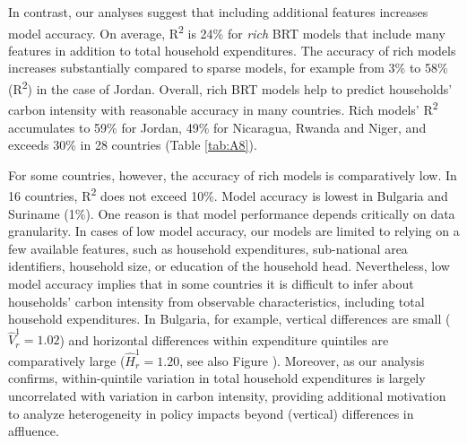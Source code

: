 \documentclass[12pt, a4paper]{article}
\begin{document}
In contrast, our analyses suggest that including additional features increases model accuracy. On average, R\textsuperscript{2} is 24\% for \textit{rich} BRT models that include many features in addition to total household expenditures. The accuracy of rich models increases substantially compared to sparse models, for example from 3\% to 58\% (R\textsuperscript{2}) in the case of Jordan. Overall, rich BRT models help to predict households' carbon intensity with reasonable accuracy in many countries. Rich models' R\textsuperscript{2} accumulates to 59\% for Jordan, 49\% for Nicaragua, Rwanda and Niger, and exceeds 30\% in 28 countries (Table \ref{tab:A8}).

For some countries, however, the accuracy of rich models is comparatively low. In 16 countries, R\textsuperscript{2} does not exceed 10\%. Model accuracy is lowest in Bulgaria and Suriname (1\%). One reason is that model performance depends critically on data granularity. In cases of low model accuracy, our models are limited to relying on a few available features, such as household expenditures, sub-national area identifiers, household size, or education of the household head. Nevertheless, low model accuracy implies that in some countries it is difficult to infer about households' carbon intensity from observable characteristics, including total household expenditures. In Bulgaria, for example, vertical differences are small ($\widehat{V}_{r}^{1}=1.02$) and horizontal differences within expenditure quintiles are comparatively large ($\widehat{H}_{r}^{1}=1.20$, see also Figure ). Moreover, as our analysis confirms, within-quintile variation in total household expenditures is largely uncorrelated with variation in carbon intensity, providing additional motivation to analyze heterogeneity in policy impacts beyond (vertical) differences in affluence.
\end{document}
